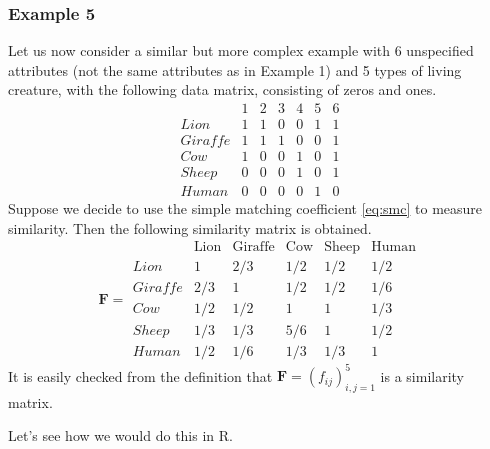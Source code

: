 \documentclass[
]{book}
\theoremstyle{definition}
\theoremstyle{definition}
\theoremstyle{definition}
\theoremstyle{definition}
\theoremstyle{remark}
\begin{document}
\subsubsection*{Example 5}\label{example-5}

Let us now consider a similar but more complex example with 6 unspecified attributes (not the same attributes as in Example 1) and 5 types of living creature, with the following data matrix, consisting of zeros and ones.
\[
\begin{array}{lcccccc}
&1&2&3&4&5&6\\
Lion&1&1&0&0&1&1\\
Giraffe&1&1&1&0&0&1\\
Cow&1&0&0&1&0&1\\
Sheep&0&0&0&1&0&1\\
Human&0&0&0&0&1&0
\end{array}
\]
Suppose we decide to use the simple matching coefficient \eqref{eq:smc} to measure similarity. Then the following similarity matrix is obtained.
\[
\mathbf F=\begin{array}{lccccc}
&\text{Lion}&\text{Giraffe}&\text{Cow}&\text{Sheep}&\text{Human}\\
Lion&1&2/3&1/2&1/2&1/2\\
Giraffe&2/3&1&1/2&1/2&1/6\\
Cow&1/2&1/2&1&1&1/3\\
Sheep&1/3 &1/3 &5/6& 1 &1/2\\
Human&1/2&1/6&1/3&1/3&1
\end{array}
\]
It is easily checked from the definition that \({\mathbf F}=(f_{ij})_{i,j=1}^5\) is a similarity matrix.

Let's see how we would do this in R.
\end{document}
